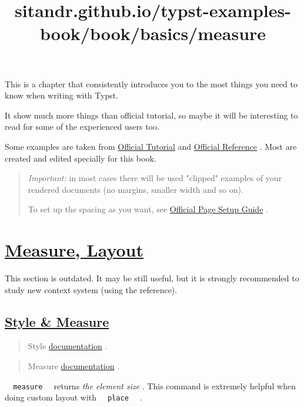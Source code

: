 This is a chapter that consistently introduces you to the most things
you need to know when writing with Typst.

It show much more things than official tutorial, so maybe it will be
interesting to read for some of the experienced users too.

Some examples are taken from
\href{https://typst.app/docs/tutorial/}{Official Tutorial} and
\href{https://typst.app/docs/reference/}{Official Reference} . Most are
created and edited specially for this book.

\begin{quote}
\emph{Important:} in most cases there will be used "clipped" examples of
your rendered documents (no margins, smaller width and so on).

To set up the spacing as you want, see
\href{https://typst.app/docs/guides/page-setup-guide/}{Official Page
Setup Guide} .
\end{quote}


\title{sitandr.github.io/typst-examples-book/book/basics/measure}

\section{\texorpdfstring{\hyperref[measure-layout]{Measure,
Layout}}{Measure, Layout}}\label{measure-layout}

This section is outdated. It may be still useful, but it is strongly
recommended to study new context system (using the reference).

\subsection{\texorpdfstring{\hyperref[style--measure]{Style \&
Measure}}{Style \& Measure}}\label{style--measure}

\begin{quote}
Style
\href{https://typst.app/docs/reference/foundations/style/}{documentation}
.
\end{quote}

\begin{quote}
Measure
\href{https://typst.app/docs/reference/layout/measure/}{documentation} .
\end{quote}

\texttt{\ }{\texttt{\ measure\ }}\texttt{\ } returns \emph{the element
size} . This command is extremely helpful when doing custom layout with
\texttt{\ }{\texttt{\ place\ }}\texttt{\ } .

